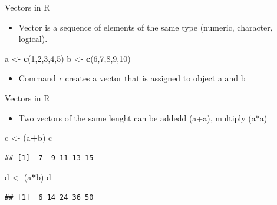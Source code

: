 \documentclass[
  ignorenonframetext,
]{beamer}
\newenvironment{Shaded}{\begin{snugshade}}{\end{snugshade}}
\newcommand{\DecValTok}[1]{\textcolor[rgb]{0.00,0.00,0.81}{#1}}
\newcommand{\FunctionTok}[1]{\textcolor[rgb]{0.13,0.29,0.53}{\textbf{#1}}}
\newcommand{\NormalTok}[1]{#1}
\newcommand{\OtherTok}[1]{\textcolor[rgb]{0.56,0.35,0.01}{#1}}
\newcommand{\SpecialCharTok}[1]{\textcolor[rgb]{0.81,0.36,0.00}{\textbf{#1}}}
\providecommand{\tightlist}{%
  \setlength{\itemsep}{0pt}\setlength{\parskip}{0pt}}
\begin{document}
\begin{frame}[fragile]{Vectors in R}
\label{vectors-in-r}
\begin{itemize}
\tightlist
\item
  Vector is a sequence of elements of the same type (numeric, character,
  logical).
\end{itemize}

\begin{Shaded}
\begin{Highlighting}[]
\NormalTok{a }\OtherTok{\textless{}{-}} \FunctionTok{c}\NormalTok{(}\DecValTok{1}\NormalTok{,}\DecValTok{2}\NormalTok{,}\DecValTok{3}\NormalTok{,}\DecValTok{4}\NormalTok{,}\DecValTok{5}\NormalTok{)}
\NormalTok{b }\OtherTok{\textless{}{-}} \FunctionTok{c}\NormalTok{(}\DecValTok{6}\NormalTok{,}\DecValTok{7}\NormalTok{,}\DecValTok{8}\NormalTok{,}\DecValTok{9}\NormalTok{,}\DecValTok{10}\NormalTok{)}
\end{Highlighting}
\end{Shaded}

\begin{itemize}
\tightlist
\item
  Command \emph{c} creates a vector that is assigned to object a and b
\end{itemize}
\end{frame}

\begin{frame}[fragile]{Vectors in R}
\label{vectors-in-r-1}
\begin{itemize}
\tightlist
\item
  Two vectors of the same lenght can be addedd (a+a), multiply (a*a)
\end{itemize}

\begin{Shaded}
\begin{Highlighting}[]
\NormalTok{c }\OtherTok{\textless{}{-}}\NormalTok{ (a}\SpecialCharTok{+}\NormalTok{b)}
\NormalTok{c}
\end{Highlighting}
\end{Shaded}

\begin{verbatim}
## [1]  7  9 11 13 15
\end{verbatim}

\begin{Shaded}
\begin{Highlighting}[]
\NormalTok{d }\OtherTok{\textless{}{-}}\NormalTok{ (a}\SpecialCharTok{*}\NormalTok{b)}
\NormalTok{d}
\end{Highlighting}
\end{Shaded}

\begin{verbatim}
## [1]  6 14 24 36 50
\end{verbatim}
\end{frame}
\end{document}

